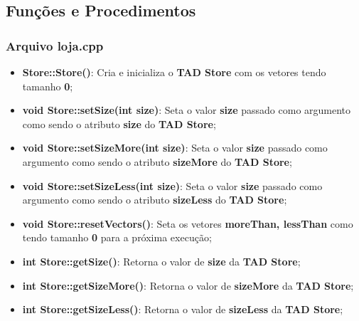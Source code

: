 \documentclass[12pt]{article}
\begin{document}
    \subsection{Funções e Procedimentos}
    \subsubsection{Arquivo loja.cpp}
    \begin{itemize}
    \item \textbf{Store::Store()}: Cria e inicializa o \textbf{TAD Store} com os vetores tendo tamanho \textbf{0};
    \item \textbf{void Store::setSize(int size)}: Seta o valor \textbf{size} passado como argumento como sendo o atributo \textbf{size} do \textbf{TAD Store};
    \item \textbf{void Store::setSizeMore(int size)}: Seta o valor \textbf{size} passado como argumento como sendo o atributo \textbf{sizeMore} do \textbf{TAD Store};
    \item \textbf{void Store::setSizeLess(int size)}: Seta o valor \textbf{size} passado como argumento como sendo o atributo \textbf{sizeLess} do \textbf{TAD Store};
    \item \textbf{void Store::resetVectors()}: Seta os vetores \textbf{moreThan, lessThan} como tendo tamanho \textbf{0} para a próxima execução;
    \item \textbf{int Store::getSize()}: Retorna o valor de \textbf{size} da \textbf{TAD Store};
    \item \textbf{int Store::getSizeMore()}: Retorna o valor de \textbf{sizeMore} da \textbf{TAD Store};
    \item \textbf{int Store::getSizeLess()}: Retorna o valor de \textbf{sizeLess} da \textbf{TAD Store};
    

\end{itemize}
\end{document}
